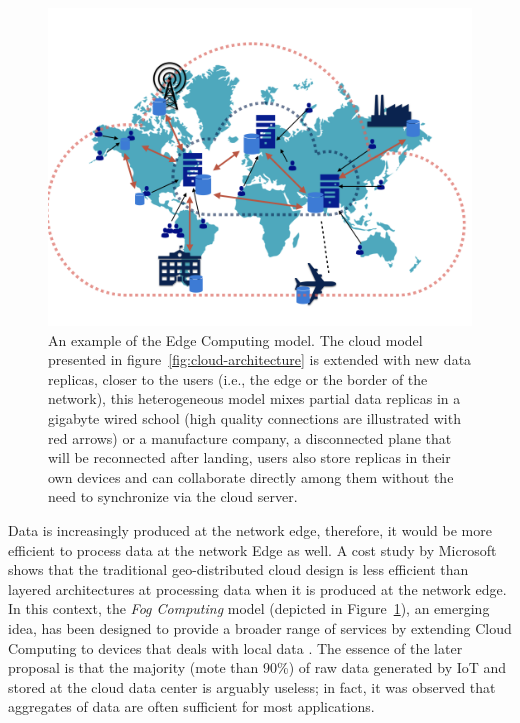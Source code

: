 \begin{figure}[tph]
    \centering
    \includegraphics[scale=0.42]{figures/fog-architecture.png}
    \caption{An example of the Edge Computing model. The cloud model presented in figure~\ref{fig:cloud-architecture} is extended with new data replicas, closer to the users (i.e., the edge or the border of the network), this heterogeneous model mixes partial data replicas in a gigabyte wired school (high quality connections are illustrated with red arrows) or a manufacture company, a disconnected plane that will be reconnected after landing, users also store replicas in their own devices and can collaborate directly among them without the need to synchronize via the cloud server.}
    \label{fig:fog-architecture}
\end{figure}

Data is increasingly produced at the network edge,
therefore, it would be more efficient to process data at the network Edge as 
well.
A cost study by Microsoft \cite{greenberg2008cost} shows that 
the traditional geo-distributed cloud design is less efficient than layered architectures at processing data when it 
is produced at the network edge.
In this context, 
the \textit{Fog Computing} model (depicted in Figure~\ref{fig:fog-architecture}), an emerging idea,
has been designed to provide a broader range of services by extending Cloud 
Computing to devices that deals with local data \cite{bonomi2012fog}.
The essence of the later proposal is that the majority (mote than 90\%) of raw data generated by IoT and stored at the cloud data center is arguably useless; in fact, it was observed that aggregates of data are often sufficient for most applications.

